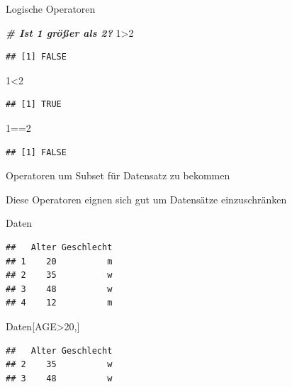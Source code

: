 \documentclass[
  ignorenonframetext,
]{beamer}
\newenvironment{Shaded}{\begin{snugshade}}{\end{snugshade}}
\newcommand{\CommentTok}[1]{\textcolor[rgb]{0.00,0.40,1.00}{\textbf{\textit{#1}}}}
\newcommand{\DecValTok}[1]{\textcolor[rgb]{0.27,0.67,0.26}{#1}}
\newcommand{\NormalTok}[1]{\textcolor[rgb]{0.74,0.68,0.62}{#1}}
\newcommand{\OperatorTok}[1]{\textcolor[rgb]{0.74,0.68,0.62}{#1}}
\begin{document}
\begin{frame}[fragile]{Logische Operatoren}
\protect\hypertarget{logische-operatoren}{}

\begin{Shaded}
\begin{Highlighting}[]
\CommentTok{# Ist 1 größer als 2?}
\DecValTok{1}\OperatorTok{>}\DecValTok{2}
\end{Highlighting}
\end{Shaded}

\begin{verbatim}
## [1] FALSE
\end{verbatim}

\begin{Shaded}
\begin{Highlighting}[]
\DecValTok{1}\OperatorTok{<}\DecValTok{2}
\end{Highlighting}
\end{Shaded}

\begin{verbatim}
## [1] TRUE
\end{verbatim}

\begin{Shaded}
\begin{Highlighting}[]
\DecValTok{1}\OperatorTok{==}\DecValTok{2}
\end{Highlighting}
\end{Shaded}

\begin{verbatim}
## [1] FALSE
\end{verbatim}

\end{frame}

\begin{frame}[fragile]{Operatoren um Subset für Datensatz zu bekommen}
\protect\hypertarget{operatoren-um-subset-fur-datensatz-zu-bekommen}{}

Diese Operatoren eignen sich gut um Datensätze einzuschränken

\begin{Shaded}
\begin{Highlighting}[]
\NormalTok{Daten}
\end{Highlighting}
\end{Shaded}

\begin{verbatim}
##   Alter Geschlecht
## 1    20          m
## 2    35          w
## 3    48          w
## 4    12          m
\end{verbatim}

\begin{Shaded}
\begin{Highlighting}[]
\NormalTok{Daten[AGE}\OperatorTok{>}\DecValTok{20}\NormalTok{,]}
\end{Highlighting}
\end{Shaded}

\begin{verbatim}
##   Alter Geschlecht
## 2    35          w
## 3    48          w
\end{verbatim}

\end{frame}
\end{document}
